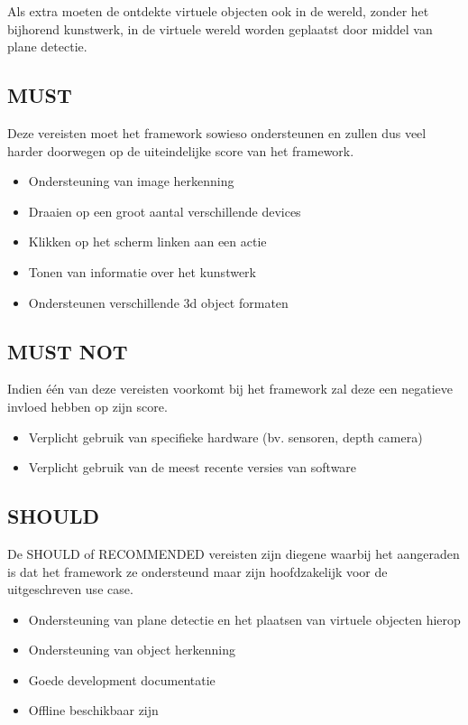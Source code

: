 Als extra moeten de ontdekte virtuele objecten ook in de wereld, zonder het bijhorend kunstwerk, in de virtuele wereld worden geplaatst door middel van plane detectie.

\subsection{MUST}
Deze vereisten moet het framework sowieso ondersteunen en zullen dus veel harder doorwegen op de uiteindelijke score van het framework.
\begin{itemize}
    \item Ondersteuning van image herkenning
    \item Draaien op een groot aantal verschillende devices
    \item Klikken op het scherm linken aan een actie
    \item Tonen van informatie over het kunstwerk
    \item Ondersteunen verschillende 3d object formaten
\end{itemize} 

\subsection{MUST NOT}
Indien één van deze vereisten voorkomt bij het framework zal deze een negatieve invloed hebben op zijn score.
\begin{itemize}
    \item Verplicht gebruik van specifieke hardware (bv. sensoren, depth camera)
    \item Verplicht gebruik van de meest recente versies van software
\end{itemize} 

\subsection{SHOULD}
De SHOULD of RECOMMENDED vereisten zijn diegene waarbij het aangeraden is dat het framework ze ondersteund maar zijn hoofdzakelijk voor de uitgeschreven use case.
\begin{itemize}
    \item Ondersteuning van plane detectie en het plaatsen van virtuele objecten hierop
    \item Ondersteuning van object herkenning
    \item Goede development documentatie
    \item Offline beschikbaar zijn
\end{itemize} 

